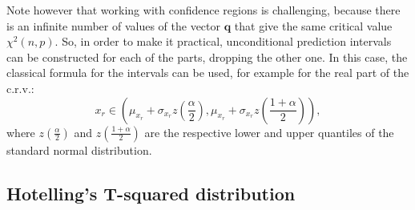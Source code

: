 \documentclass[
]{book}
\begin{document}
Note however that working with confidence regions is challenging, because there is an infinite number of values of the vector \(\mathbf{q}\) that give the same critical value \(\chi^2(n, p)\). So, in order to make it practical, unconditional prediction intervals can be constructed for each of the parts, dropping the other one. In this case, the classical formula for the intervals can be used, for example for the real part of the c.r.v.:
\begin{equation}
    x_{r} \in \left( \mu_{x_r} + \sigma_{x_r} z \left({\frac{\alpha}{2}} \right) , \mu_{x_r} + \sigma_{x_r} z \left({\frac{1+\alpha}{2}} \right) \right),
    \label{eq:NormalInterval}
\end{equation}
where \(z\left({\frac{\alpha}{2}} \right)\) and \(z\left({\frac{1+\alpha}{2}} \right)\) are the respective lower and upper quantiles of the standard normal distribution.

\hypertarget{Hotelling}{%
\subsection{Hotelling's T-squared distribution}\label{Hotelling}}
\end{document}
